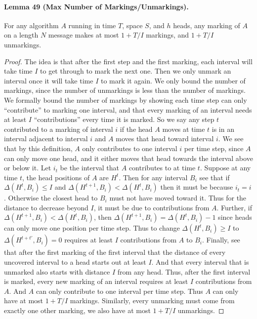 \paragraph{Lemma 49 (Max Number of Markings/Unmarkings).} For any algorithm $A$ running in time $T$, space $S$, and $h$ heads, any marking of $A$ on a length $N$ message makes at most $1+T/I$ markings, and $1+T/I$ unmarkings.
\begin{proof}
The idea is that after the first step and the first marking, each interval will take time $I$ to get through to mark the next one. Then we only unmark an interval once it will take time $I$ to mark it again.
We only bound the number of markings, since the number of unmarkings is less than the number of markings.
We formally bound the number of markings by showing each time step can only ``contribute'' to marking one interval, and that every marking of an interval needs at least $I$ ``contributions'' every time it is marked.
So we say any step $t$ contributed to a marking of interval $i$ if the head $A$ moves at time $t$ is in an interval adjacent to interval $i$ and $A$ moves that head toward interval $i$. We see that by this definition, $A$ only contributes to one interval $i$ per time step, since $A$ can only move one head, and it either moves that head towards the interval above or below it. Let $i_t$ be the interval that $A$ contributes to at time $t$.
Suppose at any time $t$, the head positions of $A$ are $H^t$. Then for any interval $B_i$ see that if $\Delta(H^t,B_i)\le I$ and $\Delta(H^{t+1},B_i)<\Delta(H^t,B_i)$ then it must be because $i_t=i$. Otherwise the closest head to $B_i$ must not have moved toward it. Thus for the distance to decrease beyond $I$, it must be due to contributions from $A$.
Further, if $\Delta(H^{t+1},B_i)<\Delta(H^t,B_i)$, then $\Delta(H^{t+1},B_i)=\Delta(H^t,B_i)-1$ since heads can only move one position per time step. Thus to change $\Delta(H^t,B_i)\ge I$ to $\Delta(H^{t+t'},B_i)=0$ requires at least $I$ contributions from $A$ to $B_i$.
Finally, see that after the first marking of the first interval that the distance of every uncovered interval to a head starts out at least $I$. And that every interval that is unmarked also starts with distance $I$ from any head.
Thus, after the first interval is marked, every new marking of an interval requires at least $I$ contributions from $A$. And $A$ can only contribute to one interval per time step. Thus $A$ can only have at most $1+T/I$ markings. Similarly, every unmarking must come from exactly one other marking, we also have at most $1+T/I$ unmarkings.
\end{proof}
